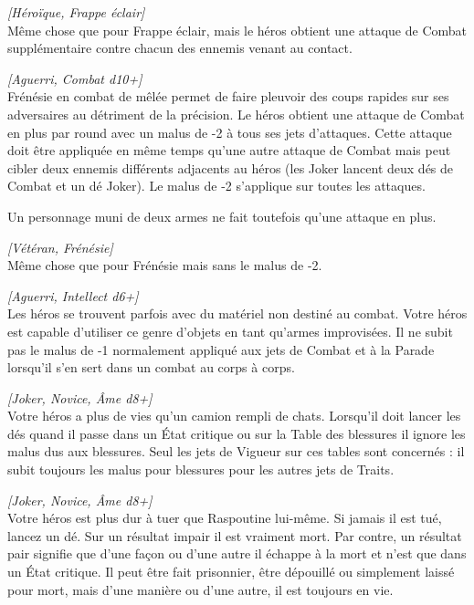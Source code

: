 \begin{description}[align=left]
    \item [Frappe foudroyante]
    	\emph{[Héroïque, Frappe éclair]}\\
        Même chose que pour Frappe éclair, mais le héros obtient une attaque de Combat supplémentaire contre chacun des ennemis venant au contact.

    \item [Frénésie]
    	\emph{[Aguerri, Combat d10+]}\\
        Frénésie en combat de mêlée permet de faire pleuvoir des coups rapides sur ses adversaires au détriment de la précision. Le héros obtient une attaque de Combat en plus par round avec un malus de -2 à tous ses jets d’attaques. Cette attaque doit être appliquée en même temps qu’une autre attaque de Combat mais peut cibler deux ennemis différents adjacents au héros (les Joker lancent deux dés de Combat et un dé Joker). Le malus de -2 s’applique sur toutes les attaques. 

        Un personnage muni de deux armes ne fait toutefois qu’une attaque en plus.

    \item [Frénésie suprême]
    	\emph{[Vétéran, Frénésie]}\\
        Même chose que pour Frénésie mais sans le malus de -2.

    \item [Improvisation martiale]
    	\emph{[Aguerri, Intellect d6+]}\\
        Les héros se trouvent parfois avec du matériel non destiné au combat. Votre héros est capable d’utiliser ce genre d’objets en tant qu’armes improvisées. Il ne subit pas le malus de -1 normalement appliqué aux jets de Combat et à la Parade lorsqu’il s’en sert dans un combat au corps à corps.

    \item [Increvable]
    	\emph{[Joker, Novice, Âme d8+]}\\
        Votre héros a plus de vies qu’un camion rempli de chats. Lorsqu’il doit lancer les dés quand il passe dans un \'Etat critique ou sur la Table des blessures il ignore les malus dus aux blessures. Seul les jets de Vigueur sur ces tables sont concernés : il subit toujours les malus pour blessures pour les autres jets de Traits.

    \item [Trompe-la-mort]
    	\emph{[Joker, Novice, Âme d8+]}\\
        Votre héros est plus dur à tuer que Raspoutine lui-même. Si jamais il est tué, lancez un dé. Sur un résultat impair il est vraiment mort. Par contre, un résultat pair signifie que d’une façon ou d’une autre il échappe à la mort et n’est que dans un \'Etat critique. Il peut être fait prisonnier, être dépouillé ou simplement laissé pour mort, mais d’une manière ou d’une autre, il est toujours en vie.


\end{description}

